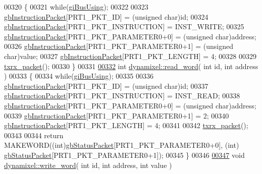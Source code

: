 \begin{DoxyCode}
00320 \{
00321     \textcolor{keywordflow}{while}(\hyperlink{a00003_ad10e0e49f5fef04bf789a89c14cc470a}{giBusUsing});
00322 
00323     \hyperlink{a00003_afd94dcf01b8e96298727776e222de722}{gbInstructionPacket}[PRT1\_PKT\_ID] = (\textcolor{keywordtype}{unsigned} char)\textcolor{keywordtype}{id};
00324     \hyperlink{a00003_afd94dcf01b8e96298727776e222de722}{gbInstructionPacket}[PRT1\_PKT\_INSTRUCTION] = INST\_WRITE;
00325     \hyperlink{a00003_afd94dcf01b8e96298727776e222de722}{gbInstructionPacket}[PRT1\_PKT\_PARAMETER0+0] = (\textcolor{keywordtype}{unsigned} char)address;
00326     \hyperlink{a00003_afd94dcf01b8e96298727776e222de722}{gbInstructionPacket}[PRT1\_PKT\_PARAMETER0+1] = (\textcolor{keywordtype}{unsigned} char)value;
00327     \hyperlink{a00003_afd94dcf01b8e96298727776e222de722}{gbInstructionPacket}[PRT1\_PKT\_LENGTH] = 4;
00328     
00329     \hyperlink{a00003_aebfc569c6b1eb0b98f8c385f0f921fc0}{txrx\_packet}();
00330 \}
00331 
\hypertarget{a00012_source_l00332}{}\hyperlink{a00003_a45e99341e82c5114f6e829c9141bf96f}{00332} \textcolor{keywordtype}{int} \hyperlink{a00003_a45e99341e82c5114f6e829c9141bf96f}{dynamixel::read\_word}( \textcolor{keywordtype}{int} \textcolor{keywordtype}{id}, \textcolor{keywordtype}{int} address )
00333 \{
00334     \textcolor{keywordflow}{while}(\hyperlink{a00003_ad10e0e49f5fef04bf789a89c14cc470a}{giBusUsing});
00335 
00336     \hyperlink{a00003_afd94dcf01b8e96298727776e222de722}{gbInstructionPacket}[PRT1\_PKT\_ID] = (\textcolor{keywordtype}{unsigned} char)\textcolor{keywordtype}{id};
00337     \hyperlink{a00003_afd94dcf01b8e96298727776e222de722}{gbInstructionPacket}[PRT1\_PKT\_INSTRUCTION] = INST\_READ;
00338     \hyperlink{a00003_afd94dcf01b8e96298727776e222de722}{gbInstructionPacket}[PRT1\_PKT\_PARAMETER0+0] = (\textcolor{keywordtype}{unsigned} char)address;
00339     \hyperlink{a00003_afd94dcf01b8e96298727776e222de722}{gbInstructionPacket}[PRT1\_PKT\_PARAMETER0+1] = 2;
00340     \hyperlink{a00003_afd94dcf01b8e96298727776e222de722}{gbInstructionPacket}[PRT1\_PKT\_LENGTH] = 4;
00341     
00342     \hyperlink{a00003_aebfc569c6b1eb0b98f8c385f0f921fc0}{txrx\_packet}();
00343 
00344     \textcolor{keywordflow}{return} MAKEWORD((\textcolor{keywordtype}{int})\hyperlink{a00003_aa57c86d3bbbeaf5c9d4f6bd00376b04f}{gbStatusPacket}[PRT1\_PKT\_PARAMETER0+0], (\textcolor{keywordtype}{int})
      \hyperlink{a00003_aa57c86d3bbbeaf5c9d4f6bd00376b04f}{gbStatusPacket}[PRT1\_PKT\_PARAMETER0+1]);
00345 \}
00346 
\hypertarget{a00012_source_l00347}{}\hyperlink{a00003_a925f62ce5e261e5ef4fe6dc46bdc7c63}{00347} \textcolor{keywordtype}{void} \hyperlink{a00003_a925f62ce5e261e5ef4fe6dc46bdc7c63}{dynamixel::write\_word}( \textcolor{keywordtype}{int} \textcolor{keywordtype}{id}, \textcolor{keywordtype}{int} address, \textcolor{keywordtype}{int} value )

\end{DoxyCode}
